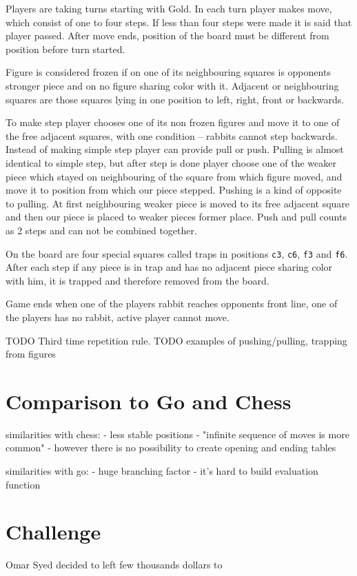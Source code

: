
Players are taking turns starting with Gold. In each turn player makes move,
which consist of one to four steps. If less than four steps were made it is
said that player passed. After move ends, position of the board must be
different from position before turn started.

Figure is considered frozen if on one of its neighbouring squares is opponents
stronger piece and on no figure sharing color with it. Adjacent or neighbouring
squares are those squares lying in one position to left, right, front or
backwards.


To make step player chooses one of its non frozen figures and move it to one of
the free adjacent squares, with one condition -- rabbits cannot step backwards.
Instead of making simple step player can provide pull or push. Pulling is
almost identical to simple step, but after step is done player choose one of
the weaker piece which stayed on neighbouring of the square from which figure
moved, and move it to position from which our piece stepped. Pushing is a kind
of opposite to pulling. At first neighbouring weaker piece is moved to its free
adjacent square and then our piece is placed to weaker pieces former place.
Push and pull counts as 2 steps and can not be combined together.

On the board are four special squares called traps in positions \texttt{c3},
\texttt{c6}, \texttt{f3} and \texttt{f6}. After each step if any piece is in
trap and has no adjacent piece sharing color with him, it is trapped and
therefore removed from the board.

Game ends when one of the players rabbit reaches opponents front line, one of
the players has no rabbit, active player cannot move.

TODO Third time repetition rule.
TODO examples of pushing/pulling, trapping from figures


\section{Comparison to Go and Chess}

similarities with chess:
- less stable positions
- "infinite sequence of moves is more common"
- however there is no possibility to create opening and ending tables

similarities with go:
- huge branching factor
- it's hard to build evaluation function


\section{Challenge}
Omar Syed decided to left few thousands dollars to
